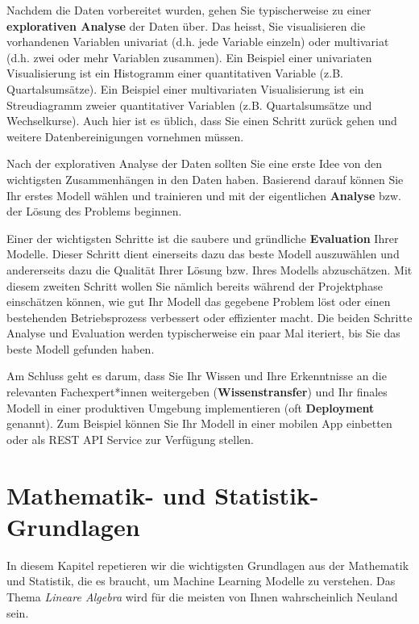 \documentclass[
]{book}
\begin{document}
Nachdem die Daten vorbereitet wurden, gehen Sie typischerweise zu einer \textbf{explorativen Analyse} der Daten über. Das heisst, Sie visualisieren die vorhandenen Variablen univariat (d.h. jede Variable einzeln) oder multivariat (d.h. zwei oder mehr Variablen zusammen). Ein Beispiel einer univariaten Visualisierung ist ein Histogramm einer quantitativen Variable (z.B. Quartalsumsätze). Ein Beispiel einer multivariaten Visualisierung ist ein Streudiagramm zweier quantitativer Variablen (z.B. Quartalsumsätze und Wechselkurse). Auch hier ist es üblich, dass Sie einen Schritt zurück gehen und weitere Datenbereinigungen vornehmen müssen.

Nach der explorativen Analyse der Daten sollten Sie eine erste Idee von den wichtigsten Zusammenhängen in den Daten haben. Basierend darauf können Sie Ihr erstes Modell wählen und trainieren und mit der eigentlichen \textbf{Analyse} bzw. der Lösung des Problems beginnen.

Einer der wichtigsten Schritte ist die saubere und gründliche \textbf{Evaluation} Ihrer Modelle. Dieser Schritt dient einerseits dazu das beste Modell auszuwählen und andererseits dazu die Qualität Ihrer Lösung bzw. Ihres Modells abzuschätzen. Mit diesem zweiten Schritt wollen Sie nämlich bereits während der Projektphase einschätzen können, wie gut Ihr Modell das gegebene Problem löst oder einen bestehenden Betriebsprozess verbessert oder effizienter macht. Die beiden Schritte Analyse und Evaluation werden typischerweise ein paar Mal iteriert, bis Sie das beste Modell gefunden haben.

Am Schluss geht es darum, dass Sie Ihr Wissen und Ihre Erkenntnisse an die relevanten Fachexpert*innen weitergeben (\textbf{Wissenstransfer}) und Ihr finales Modell in einer produktiven Umgebung implementieren (oft \textbf{Deployment} genannt). Zum Beispiel können Sie Ihr Modell in einer mobilen App einbetten oder als REST API Service zur Verfügung stellen.

\hypertarget{basics}{%
\chapter{Mathematik- und Statistik-Grundlagen}\label{basics}}

In diesem Kapitel repetieren wir die wichtigsten Grundlagen aus der Mathematik und Statistik, die es braucht, um Machine Learning Modelle zu verstehen. Das Thema \emph{Lineare Algebra} wird für die meisten von Ihnen wahrscheinlich Neuland sein.
\end{document}
